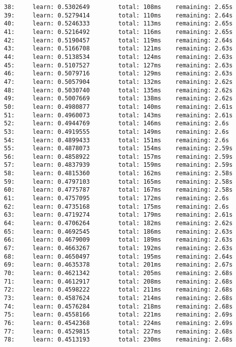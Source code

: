 \documentclass[11pt]{article}
\begin{document}
\begin{Verbatim}[commandchars=\\\{\}]
38:     learn: 0.5302649        total: 108ms    remaining: 2.65s
39:     learn: 0.5279414        total: 110ms    remaining: 2.64s
40:     learn: 0.5246333        total: 113ms    remaining: 2.65s
41:     learn: 0.5216492        total: 116ms    remaining: 2.65s
42:     learn: 0.5190457        total: 119ms    remaining: 2.64s
43:     learn: 0.5166708        total: 121ms    remaining: 2.63s
44:     learn: 0.5138534        total: 124ms    remaining: 2.63s
45:     learn: 0.5107527        total: 127ms    remaining: 2.63s
46:     learn: 0.5079716        total: 129ms    remaining: 2.63s
47:     learn: 0.5057904        total: 132ms    remaining: 2.62s
48:     learn: 0.5030740        total: 135ms    remaining: 2.62s
49:     learn: 0.5007669        total: 138ms    remaining: 2.62s
50:     learn: 0.4980877        total: 140ms    remaining: 2.61s
51:     learn: 0.4960073        total: 143ms    remaining: 2.61s
52:     learn: 0.4944769        total: 146ms    remaining: 2.6s
53:     learn: 0.4919555        total: 149ms    remaining: 2.6s
54:     learn: 0.4899433        total: 151ms    remaining: 2.6s
55:     learn: 0.4878073        total: 154ms    remaining: 2.59s
56:     learn: 0.4858922        total: 157ms    remaining: 2.59s
57:     learn: 0.4837939        total: 159ms    remaining: 2.59s
58:     learn: 0.4815360        total: 162ms    remaining: 2.58s
59:     learn: 0.4797103        total: 165ms    remaining: 2.58s
60:     learn: 0.4775787        total: 167ms    remaining: 2.58s
61:     learn: 0.4757095        total: 172ms    remaining: 2.6s
62:     learn: 0.4735168        total: 175ms    remaining: 2.6s
63:     learn: 0.4719274        total: 179ms    remaining: 2.61s
64:     learn: 0.4706264        total: 182ms    remaining: 2.62s
65:     learn: 0.4692545        total: 186ms    remaining: 2.63s
66:     learn: 0.4679009        total: 189ms    remaining: 2.63s
67:     learn: 0.4663267        total: 192ms    remaining: 2.63s
68:     learn: 0.4650497        total: 195ms    remaining: 2.64s
69:     learn: 0.4635378        total: 201ms    remaining: 2.67s
70:     learn: 0.4621342        total: 205ms    remaining: 2.68s
71:     learn: 0.4612917        total: 208ms    remaining: 2.68s
72:     learn: 0.4598222        total: 211ms    remaining: 2.68s
73:     learn: 0.4587624        total: 214ms    remaining: 2.68s
74:     learn: 0.4576284        total: 218ms    remaining: 2.68s
75:     learn: 0.4558166        total: 221ms    remaining: 2.69s
76:     learn: 0.4542368        total: 224ms    remaining: 2.69s
77:     learn: 0.4529815        total: 227ms    remaining: 2.68s
78:     learn: 0.4513193        total: 230ms    remaining: 2.68s

\end{Verbatim}
\end{document}
